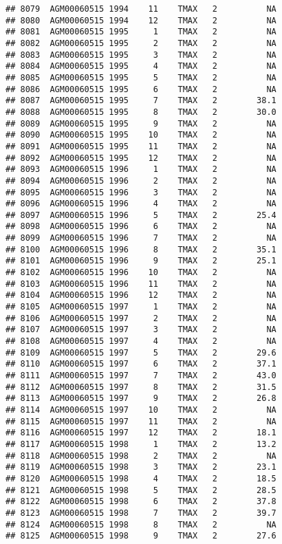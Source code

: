 \documentclass{article}\usepackage[]{graphicx}\usepackage[]{color}
\makeatletter
\newenvironment{kframe}{%
 \def\at@end@of@kframe{}%
 \ifinner\ifhmode%
  \def\at@end@of@kframe{\end{minipage}}%
  \begin{minipage}{\columnwidth}%
 \fi\fi%
 \def\FrameCommand##1{\hskip\@totalleftmargin \hskip-\fboxsep
 \colorbox{shadecolor}{##1}\hskip-\fboxsep
     \hskip-\linewidth \hskip-\@totalleftmargin \hskip\columnwidth}%
 \MakeFramed {\advance\hsize-\width
   \@totalleftmargin\z@ \linewidth\hsize
   \@setminipage}}%
 {\par\unskip\endMakeFramed%
 \at@end@of@kframe}
\newenvironment{knitrout}{}{} %
\makeatother
\begin{document}
\begin{knitrout}
\begin{kframe}
\begin{verbatim}
## 8079  AGM00060515 1994    11    TMAX   2          NA
## 8080  AGM00060515 1994    12    TMAX   2          NA
## 8081  AGM00060515 1995     1    TMAX   2          NA
## 8082  AGM00060515 1995     2    TMAX   2          NA
## 8083  AGM00060515 1995     3    TMAX   2          NA
## 8084  AGM00060515 1995     4    TMAX   2          NA
## 8085  AGM00060515 1995     5    TMAX   2          NA
## 8086  AGM00060515 1995     6    TMAX   2          NA
## 8087  AGM00060515 1995     7    TMAX   2        38.1
## 8088  AGM00060515 1995     8    TMAX   2        30.0
## 8089  AGM00060515 1995     9    TMAX   2          NA
## 8090  AGM00060515 1995    10    TMAX   2          NA
## 8091  AGM00060515 1995    11    TMAX   2          NA
## 8092  AGM00060515 1995    12    TMAX   2          NA
## 8093  AGM00060515 1996     1    TMAX   2          NA
## 8094  AGM00060515 1996     2    TMAX   2          NA
## 8095  AGM00060515 1996     3    TMAX   2          NA
## 8096  AGM00060515 1996     4    TMAX   2          NA
## 8097  AGM00060515 1996     5    TMAX   2        25.4
## 8098  AGM00060515 1996     6    TMAX   2          NA
## 8099  AGM00060515 1996     7    TMAX   2          NA
## 8100  AGM00060515 1996     8    TMAX   2        35.1
## 8101  AGM00060515 1996     9    TMAX   2        25.1
## 8102  AGM00060515 1996    10    TMAX   2          NA
## 8103  AGM00060515 1996    11    TMAX   2          NA
## 8104  AGM00060515 1996    12    TMAX   2          NA
## 8105  AGM00060515 1997     1    TMAX   2          NA
## 8106  AGM00060515 1997     2    TMAX   2          NA
## 8107  AGM00060515 1997     3    TMAX   2          NA
## 8108  AGM00060515 1997     4    TMAX   2          NA
## 8109  AGM00060515 1997     5    TMAX   2        29.6
## 8110  AGM00060515 1997     6    TMAX   2        37.1
## 8111  AGM00060515 1997     7    TMAX   2        43.0
## 8112  AGM00060515 1997     8    TMAX   2        31.5
## 8113  AGM00060515 1997     9    TMAX   2        26.8
## 8114  AGM00060515 1997    10    TMAX   2          NA
## 8115  AGM00060515 1997    11    TMAX   2          NA
## 8116  AGM00060515 1997    12    TMAX   2        18.1
## 8117  AGM00060515 1998     1    TMAX   2        13.2
## 8118  AGM00060515 1998     2    TMAX   2          NA
## 8119  AGM00060515 1998     3    TMAX   2        23.1
## 8120  AGM00060515 1998     4    TMAX   2        18.5
## 8121  AGM00060515 1998     5    TMAX   2        28.5
## 8122  AGM00060515 1998     6    TMAX   2        37.8
## 8123  AGM00060515 1998     7    TMAX   2        39.7
## 8124  AGM00060515 1998     8    TMAX   2          NA
## 8125  AGM00060515 1998     9    TMAX   2        27.6

\end{verbatim}
\end{kframe}
\end{knitrout}
\end{document}
